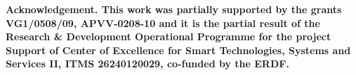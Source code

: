 \documentclass[6pt]{article}
\begin{document}
\begin{description}
 \item  \bf Acknowledgement. \rm This work was partially supported by the grants VG1/0508/09, APVV-0208-10 and it is the partial result of the Research \& Development Operational Programme for the project Support of Center of Excellence for Smart Technologies, Systems and Services II, ITMS 26240120029, co-funded by the ERDF.
\end{description}



\end{document}
